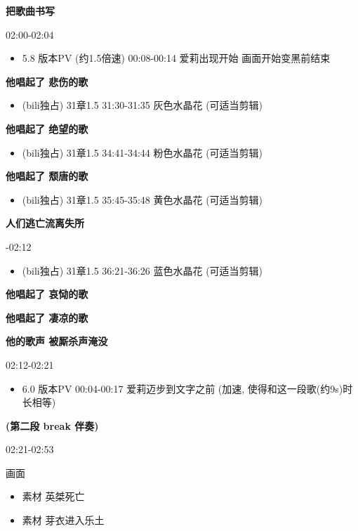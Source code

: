 \documentclass[a4paper]{article}
\begin{document}
\textbf{把歌曲书写}

02:00-02:04

\begin{itemize}
    \item 5.8 版本PV (约1.5倍速) 00:08-00:14 爱莉出现开始 画面开始变黑前结束
\end{itemize}

\textbf{他唱起了 悲伤的歌}

\begin{itemize}
    \item (bili独占) 31章1.5 31:30-31:35 灰色水晶花 (可适当剪辑)
\end{itemize}

\textbf{他唱起了 绝望的歌}

\begin{itemize}
    \item (bili独占) 31章1.5 34:41-34:44 粉色水晶花 (可适当剪辑)
\end{itemize}

\textbf{他唱起了 颓唐的歌}

\begin{itemize}
    \item (bili独占) 31章1.5 35:45-35:48 黄色水晶花 (可适当剪辑)
\end{itemize}

\textbf{人们逃亡流离失所}

-02:12

\begin{itemize}
    \item (bili独占) 31章1.5 36:21-36:26 蓝色水晶花 (可适当剪辑)
\end{itemize}

\textbf{他唱起了 哀恸的歌}

\textbf{他唱起了 凄凉的歌}

\textbf{他的歌声 被厮杀声淹没}

02:12-02:21

\begin{itemize}
    \item 6.0 版本PV 00:04-00:17 爱莉迈步到文字之前 (加速, 使得和这一段歌(约9s)时长相等)
\end{itemize}

\textbf{(第二段 break 伴奏)}

02:21-02:53

画面

\begin{itemize}
    \item 素材 英桀死亡
    \item 素材 芽衣进入乐土
\end{itemize}
\end{document}
